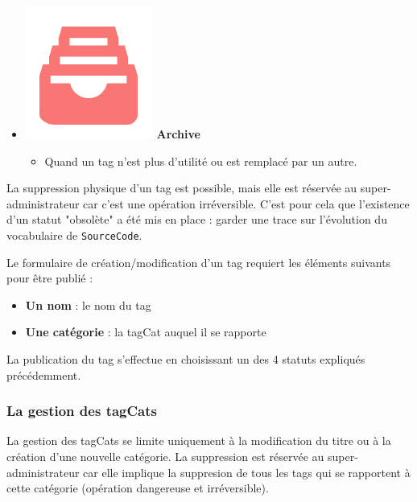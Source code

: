 \begin{itemize}
\begin{itemize}
    \end{itemize}
    \item \includegraphics[valign=b,height=1.4\fontcharht\font`X]{images/client/archive.png} \textbf{Archive}
    \begin{itemize}
        \item Quand un \gls{tag} n'est plus d'utilité ou est remplacé par un autre.
    \end{itemize}
\end{itemize}

La suppression physique d'un \gls{tag} est possible, mais elle est réservée au super-administrateur car c'est une opération irréversible. C'est pour cela que l'existence d'un statut "obsolète" a été mis en place : garder une trace sur l'évolution du vocabulaire de \texttt{SourceCode}.


Le formulaire de création/modification d'un \gls{tag} requiert les éléments suivants pour être publié :

\begin{itemize}
    \item \textbf{Un nom} : le nom du \gls{tag}
    \item \textbf{Une catégorie} : la \gls{tagCat} auquel il se rapporte
\end{itemize}

La publication du \gls{tag} s'effectue en choisissant un des 4 statuts expliqués précédemment.


\subsubsection{La gestion des \glspl{tagCat}}

La gestion des \glspl{tagCat} se limite uniquement à la modification du titre ou à la création d'une nouvelle catégorie. La suppression est réservée au super-administrateur car elle implique la suppresion de tous les \glspl{tag} qui se rapportent à cette catégorie (opération dangereuse et irréversible).

